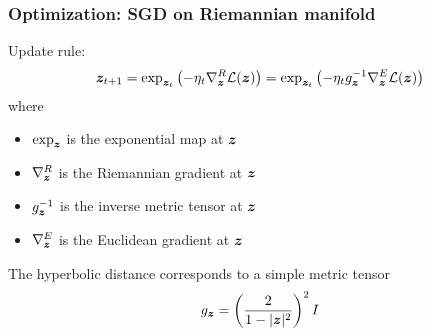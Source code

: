 \documentclass{beamer}
\begin{document}
\begin{frame}

\frametitle{Optimization: SGD on Riemannian manifold \cite{bonnabel2013stochastic}}

Update rule:
\[
{\bm z}_{t + 1}
= \exp_{{\bm z}_t} \left(-\eta_t \nabla_{\bm z}^R {\mathcal L} ({\bm z})\right)
= \exp_{{\bm z}_t} \left(-\eta_t g_{\bm z}^{-1} \nabla_{\bm z}^E {\mathcal L} ({\bm z})\right)
\]
where
\begin{itemize}
\item $\exp_{\bm z}$ is the exponential map at ${\bm z}$
\item $\nabla_{\bm z}^R$ is the Riemannian gradient at ${\bm z}$
\item $g_{\bm z}^{-1}$ is the inverse metric tensor at ${\bm z}$
\item $\nabla_{\bm z}^E$ is the Euclidean gradient at ${\bm z}$
\end{itemize}

The hyperbolic distance corresponds to a simple metric tensor
\[
g_{\bm z} = \left(\frac2{1 - |{\bm z}|^2}\right)^2 I
\]

\end{frame}

\begin{frame}[allowframebreaks]




\end{frame}
\end{document}
